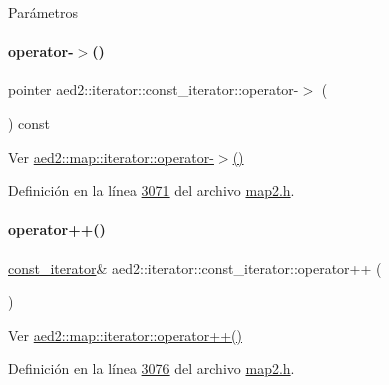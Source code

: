 \begin{DoxyParams}{\-Parámetros}
\begin{DoxyCompactItemize}
\paragraph{\texorpdfstring{operator-\/$>$()}{operator->()}}
{\footnotesize\ttfamily pointer aed2\+::iterator\+::const\+\_\+iterator\+::operator-\/$>$ (\begin{DoxyParamCaption}{ }\end{DoxyParamCaption}) const\hspace{0.3cm}{\ttfamily [inline]}}



Ver \hyperlink{classaed2_1_1map_1_1iterator_a712522d62f461c1eb9b02ecf248bae8c_a712522d62f461c1eb9b02ecf248bae8c}{aed2\+::map\+::iterator\+::operator-\/$>$()} 



Definición en la línea \hyperlink{map2_8h_source_l03071}{3071} del archivo \hyperlink{map2_8h_source}{map2.\+h}.

\mbox{\label{classaed2_1_1iterator_1_1const__iterator_acf3320ad50b0c151117e2384ec784330_acf3320ad50b0c151117e2384ec784330}} 
\paragraph{\texorpdfstring{operator++()}{operator++()}\hspace{0.1cm}{\footnotesize\ttfamily [1/2]}}
{\footnotesize\ttfamily \hyperlink{classaed2_1_1iterator_1_1const__iterator}{const\+\_\+iterator}\& aed2\+::iterator\+::const\+\_\+iterator\+::operator++ (\begin{DoxyParamCaption}{ }\end{DoxyParamCaption})\hspace{0.3cm}{\ttfamily [inline]}}



Ver \hyperlink{classaed2_1_1map_1_1iterator_a7c44de7f0508186e135ddbcfe782fec5_a7c44de7f0508186e135ddbcfe782fec5}{aed2\+::map\+::iterator\+::operator++()} 



Definición en la línea \hyperlink{map2_8h_source_l03076}{3076} del archivo \hyperlink{map2_8h_source}{map2.\+h}.


\end{DoxyCompactItemize}
\end{DoxyParams}
